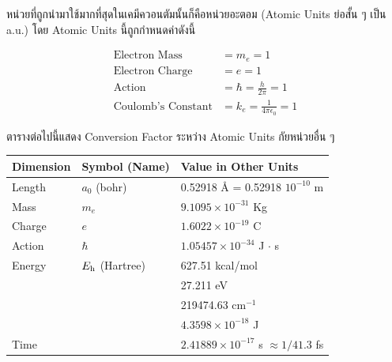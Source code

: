 หน่วยที่ถูกนำมาใช้มากที่สุดในเคมีควอนตัมนั้นก็คือหน่วยอะตอม (Atomic Units ย่อสั้น ๆ เป็น a.u.) โดย Atomic Units นี้ถูกกำหนดค่าดังนี้

\begin{align}
  \text{Electron Mass}      & = m_{e} = 1                             \\
  \text{Electron Charge}    & = e = 1                                 \\
  \text{Action}             & = \hbar = \frac{h}{2\pi} = 1            \\
  \text{Coulomb's Constant} & = k_{e} = \frac{1}{4\pi \epsilon_0} = 1
\end{align}

ตารางต่อไปนี้แสดง Conversion Factor ระหว่าง Atomic Units กัยหน่วยอื่น ๆ

\begin{table}[htbp]
  \centering
  \begin{tabular}{lll}
    \toprule
    Dimension & Symbol (Name)         & Value in Other Units                            \\
    \midrule
    Length    & $a_0$ (bohr)          & 0.52918 \AA{} = 0.52918 $10^{-10}$ m            \\
    Mass      & $m_e$                 & $9.1095 \times 10^{-31}$ Kg                     \\
    Charge    & $e$                   & $1.6022 \times 10^{-19}$ C                      \\
    Action    & $\hbar$               & $1.05457 \times 10^{-34}$ J $\cdot$ s           \\
    Energy    & $E_{\rm h}$ (Hartree) & 627.51 kcal/mol                                 \\
              &                       & 27.211 eV                                       \\
              &                       & 219474.63 cm$^{-1}$                             \\
              &                       & $4.3598 \times 10^{-18}$ J                      \\
    Time      &                       & $2.41889 \times 10^{-17}$ s $\approx 1/41.3$ fs \\
    \bottomrule
  \end{tabular}
  \label{tab:atomicunits}
\end{table}

